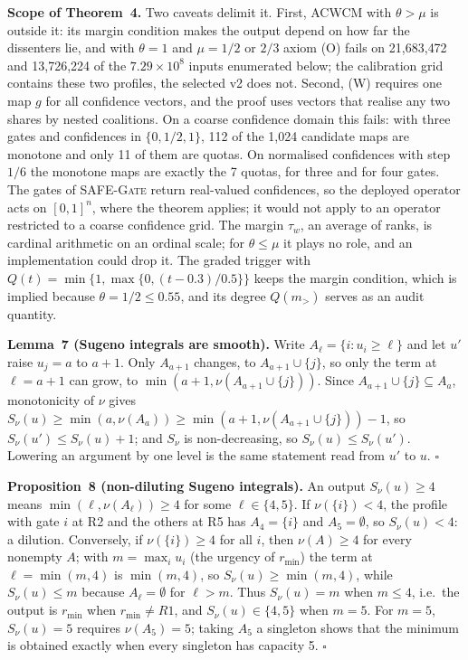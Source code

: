 \documentclass[11pt,a4paper]{article}%
\newcommand{\safegate}{\textsc{SAFE-Gate}}
\begin{document}
\textbf{Scope of Theorem~4.} Two caveats delimit it. First, ACWCM with $\theta>\mu$ is outside it: its margin condition makes the output depend on how far the dissenters lie, and with $\theta=1$ and $\mu=1/2$ or $2/3$ axiom (O) fails on 21{,}683{,}472 and 13{,}726{,}224 of the $7.29\times10^8$ inputs enumerated below; the calibration grid contains these two profiles, the selected v2 does not. Second, (W) requires one map $g$ for all confidence vectors, and the proof uses vectors that realise any two shares by nested coalitions. On a coarse confidence domain this fails: with three gates and confidences in $\{0,1/2,1\}$, 112 of the 1{,}024 candidate maps are monotone and only 11 of them are quotas. On normalised confidences with step $1/6$ the monotone maps are exactly the 7 quotas, for three and for four gates. The gates of \safegate{} return real-valued confidences, so the deployed operator acts on $[0,1]^n$, where the theorem applies; it would not apply to an operator restricted to a coarse confidence grid. The margin $\tau_w$, an average of ranks, is cardinal arithmetic on an ordinal scale; for $\theta\le\mu$ it plays no role, and an implementation could drop it. The graded trigger with $Q(t)=\min\{1,\max\{0,(t-0.3)/0.5\}\}$ keeps the margin condition, which is implied because $\theta=1/2\le0.55$, and its degree $Q(m_>)$ serves as an audit quantity.

\textbf{Lemma~7 (Sugeno integrals are smooth).} Write $A_\ell=\{i:u_i\ge\ell\}$ and let $u'$ raise $u_j=a$ to $a+1$. Only $A_{a+1}$ changes, to $A_{a+1}\cup\{j\}$, so only the term at $\ell=a+1$ can grow, to $\min(a+1,\nu(A_{a+1}\cup\{j\}))$. Since $A_{a+1}\cup\{j\}\subseteq A_a$, monotonicity of $\nu$ gives $S_\nu(u)\ge\min(a,\nu(A_a))\ge\min(a+1,\nu(A_{a+1}\cup\{j\}))-1$, so $S_\nu(u')\le S_\nu(u)+1$; and $S_\nu$ is non-decreasing, so $S_\nu(u)\le S_\nu(u')$. Lowering an argument by one level is the same statement read from $u'$ to $u$. $\square$

\textbf{Proposition~8 (non-diluting Sugeno integrals).} An output $S_\nu(u)\ge4$ means $\min(\ell,\nu(A_\ell))\ge4$ for some $\ell\in\{4,5\}$. If $\nu(\{i\})<4$, the profile with gate $i$ at R2 and the others at R5 has $A_4=\{i\}$ and $A_5=\emptyset$, so $S_\nu(u)<4$: a dilution. Conversely, if $\nu(\{i\})\ge4$ for all $i$, then $\nu(A)\ge4$ for every nonempty $A$; with $m=\max_iu_i$ (the urgency of $r_{\min}$) the term at $\ell=\min(m,4)$ is $\min(m,4)$, so $S_\nu(u)\ge\min(m,4)$, while $S_\nu(u)\le m$ because $A_\ell=\emptyset$ for $\ell>m$. Thus $S_\nu(u)=m$ when $m\le4$, i.e.\ the output is $r_{\min}$ when $r_{\min}\ne R1$, and $S_\nu(u)\in\{4,5\}$ when $m=5$. For $m=5$, $S_\nu(u)=5$ requires $\nu(A_5)=5$; taking $A_5$ a singleton shows that the minimum is obtained exactly when every singleton has capacity 5. $\square$
\end{document}
